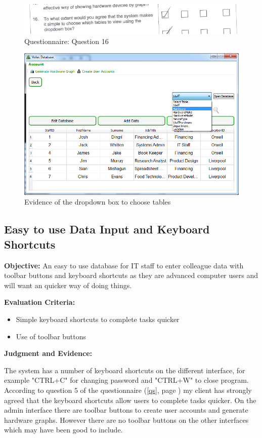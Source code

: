 \begin{figure}[H]
    \includegraphics[width=\textwidth]{./Evaluation/EvaluationQuestionnaire/16.png}
    \caption{Questionnaire: Question 16} 
\end{figure}

\begin{figure}[H]
    \includegraphics[width=\textwidth]{./Evaluation/Images/cleardb2.png}
    \caption{Evidence of the dropdown box to choose tables} 
\end{figure}

\subsection{Easy to use Data Input and Keyboard Shortcuts}

\textbf{Objective:} An easy to use database for IT staff to enter colleague data with toolbar buttons and keyboard shortcuts as they are advanced computer users and will want an quicker way of doing things.

\textbf{Evaluation Criteria:}
\begin{itemize}
\item{Simple keyboard shortcuts to complete tasks quicker}
\item{Use of toolbar buttons}
\end{itemize}

\textbf{Judgment and Evidence:}

The system has a number of keyboard shortcuts on the different interface, for example "CTRL+C" for changing password and "CTRL+W" to close program. According to question 5 of the questionnaire (\ref{qs}, page \pageref{qs}) my client has strongly agreed that the keyboard shortcuts allow users to complete tasks quicker. On the admin interface there are toolbar buttons to create user accounts and generate hardware graphs. However there are no toolbar buttons on the other interfaces which may have been good to include.


